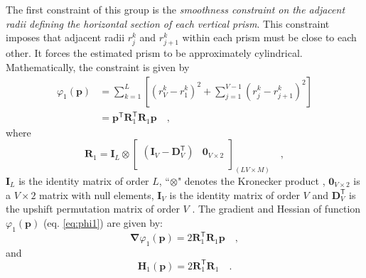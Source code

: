 The first constraint of this group is the \textit{smoothness constraint on the adjacent radii defining the horizontal section of each vertical prism}. This constraint imposes that adjacent radii $r_{j}^{k}$ and $r_{j+1}^{k}$ within each prism must be close to each other. It forces the estimated prism to be approximately cylindrical. Mathematically, the constraint is given by \begin{equation}\label{eq:phi1}
\begin{split}
\varphi_{1}(\mathbf{p}) &= \sum\limits^{L}_{k=1}\left[\left(r^{k}_{V}-r^{k}_{1}\right)^2 + \sum\limits^{V-1}_{j=1}\left(r^{k}_{j}-r^{k}_{j+1}\right)^2\right]\\
 &= \mathbf{p}^{\mathsf{T}} \mathbf{R}^{\mathsf{T}}_{1}\mathbf{R}_{1} \mathbf{p} \quad ,
\end{split}
\end{equation}
where
\begin{equation}
\mathbf{R}_{1} = 
\mathbf{I}_{L} \otimes 
\begin{bmatrix}
\left( \mathbf{I}_{V} - \mathbf{D}_{V}^\mathsf{T} \right) & \mathbf{0}_{V \times 2} \\
\end{bmatrix}_{(LV \times M)} \quad ,
\label{eq:S1-matrix}
\end{equation}
$\mathbf{I}_{L}$ is the identity matrix of order $L$, ``$\otimes$" denotes the Kronecker product \cite[][ p. 243]{horn_johnson1991}, $\mathbf{0}_{V \times 2}$ is a $V \times 2$ matrix with null elements, 
$\mathbf{I}_{V}$ is the identity matrix of order $V$ and $\mathbf{D}_{V}^\mathsf{T}$ is the upshift permutation matrix of order $V$ \cite[][ p. 20]{golub-vanloan2013}. The gradient and Hessian of function $\varphi_{1}(\mathbf{p})$ (eq. \ref{eq:phi1}) are given by:
\begin{equation}\label{eq:phi1_grad}
\boldsymbol{\nabla}\varphi_{1}(\mathbf{p}) = 2 \mathbf{R}^\mathsf{T}_{1}\mathbf{R}_{1}\mathbf{p} \quad ,
\end{equation}
and
\begin{equation}\label{eq:phi1_hessian}
\mathbf{H}_{1}(\mathbf{p}) = 2\mathbf{R}^\mathsf{T}_{1}\mathbf{R}_{1} \quad .
\end{equation}

